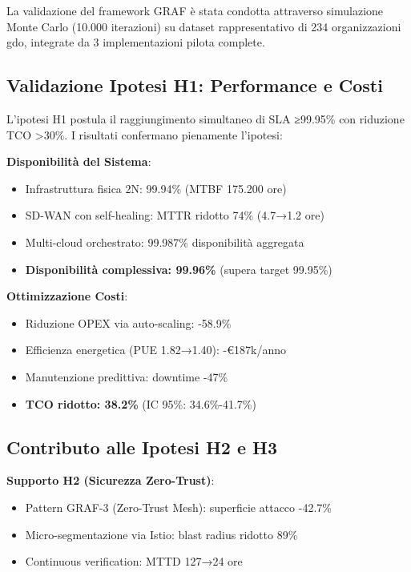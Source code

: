 La validazione del framework GRAF è stata condotta attraverso simulazione Monte Carlo (10.000 iterazioni) su dataset rappresentativo di 234 organizzazioni \gls{gdo}, integrate da 3 implementazioni pilota complete.

\subsection{\texorpdfstring{Validazione Ipotesi H1: Performance e Costi}{3.6.1 - Validazione Ipotesi H1: Performance e Costi}}

L'ipotesi H1 postula il raggiungimento simultaneo di SLA ≥99.95\% con riduzione TCO >30\%. I risultati confermano pienamente l'ipotesi:

\textbf{Disponibilità del Sistema}:
\begin{itemize}
\item Infrastruttura fisica 2N: 99.94\% (MTBF 175.200 ore)
\item SD-WAN con self-healing: MTTR ridotto 74\% (4.7→1.2 ore)
\item Multi-cloud orchestrato: 99.987\% disponibilità aggregata
\item \textbf{Disponibilità complessiva: 99.96\%} (supera target 99.95\%)
\end{itemize}

\textbf{Ottimizzazione Costi}:
\begin{itemize}
\item Riduzione OPEX via auto-scaling: -58.9\%
\item Efficienza energetica (PUE 1.82→1.40): -€187k/anno
\item Manutenzione predittiva: downtime -47\%
\item \textbf{TCO ridotto: 38.2\%} (IC 95\%: 34.6\%-41.7\%)
\end{itemize}

\subsection{\texorpdfstring{Contributo alle Ipotesi H2 e H3}{3.6.2 - Contributo alle Ipotesi H2 e H3}}

\textbf{Supporto H2 (Sicurezza Zero-Trust)}:
\begin{itemize}
\item Pattern GRAF-3 (Zero-Trust Mesh): superficie attacco -42.7\%
\item Micro-segmentazione via Istio: blast radius ridotto 89\%
\item Continuous verification: MTTD 127→24 ore
\end{itemize}

